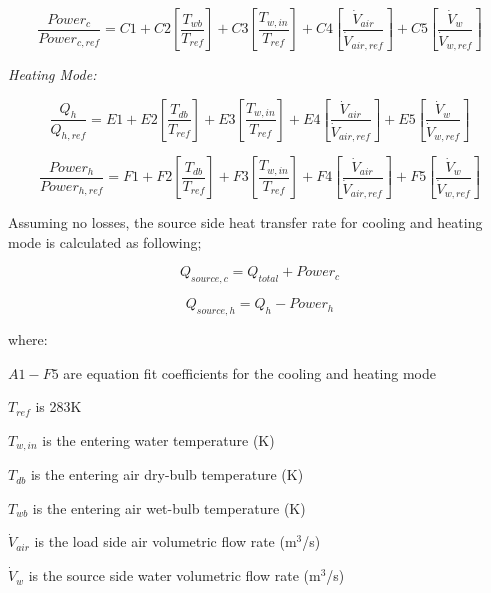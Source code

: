 \begin{equation}
\frac{{Powe{r_c}}}{{Powe{r_{c,ref}}}} = C1 + C2\left[ {\frac{{{T_{wb}}}}{{{T_{ref}}}}} \right] + C3\left[ {\frac{{{T_{w,in}}}}{{{T_{ref}}}}} \right] + C4\left[ {\frac{{{{\dot V}_{air}}}}{{{{\dot V}_{air,ref}}}}} \right] + C5\left[ {\frac{{{{\dot V}_w}}}{{{{\dot V}_{w,ref}}}}} \right]
\end{equation}

\emph{Heating Mode:}

\begin{equation}
\frac{{{Q_h}}}{{{Q_{h,ref}}}} = E1 + E2\left[ {\frac{{{T_{db}}}}{{{T_{ref}}}}} \right] + E3\left[ {\frac{{{T_{w,in}}}}{{{T_{ref}}}}} \right] + E4\left[ {\frac{{{{\dot V}_{air}}}}{{{{\dot V}_{air,ref}}}}} \right] + E5\left[ {\frac{{{{\dot V}_w}}}{{{{\dot V}_{w,ref}}}}} \right]
\end{equation}

\begin{equation}
\frac{{Powe{r_h}}}{{Powe{r_{h,ref}}}} = F1 + F2\left[ {\frac{{{T_{db}}}}{{{T_{ref}}}}} \right] + F3\left[ {\frac{{{T_{w,in}}}}{{{T_{ref}}}}} \right] + F4\left[ {\frac{{{{\dot V}_{air}}}}{{{{\dot V}_{air,ref}}}}} \right] + F5\left[ {\frac{{{{\dot V}_w}}}{{{{\dot V}_{w,ref}}}}} \right]
\end{equation}

Assuming no losses, the source side heat transfer rate for cooling and heating mode is calculated as following;

\begin{equation}
{Q_{source,c}} = {Q_{total}} + Powe{r_c}
\end{equation}

\begin{equation}
{Q_{source,h}} = {Q_h} - Powe{r_h}
\end{equation}

where:

\(A1 - F5\) are equation fit coefficients for the cooling and heating mode

\({{T_{ref}}}\) is 283K

\({{T_{w,in}}}\) is the entering water temperature (K)

\({{T_{db}}}\) is the entering air dry-bulb temperature (K)

\({{T_{wb}}}\) is the entering air wet-bulb temperature (K)

\({{{\dot V}_{air}}}\) is the load side air volumetric flow rate (m\(^{3}\)/s)

\({{{\dot V}_{w}}}\) is the source side water volumetric flow rate (m\(^{3}\)/s)

